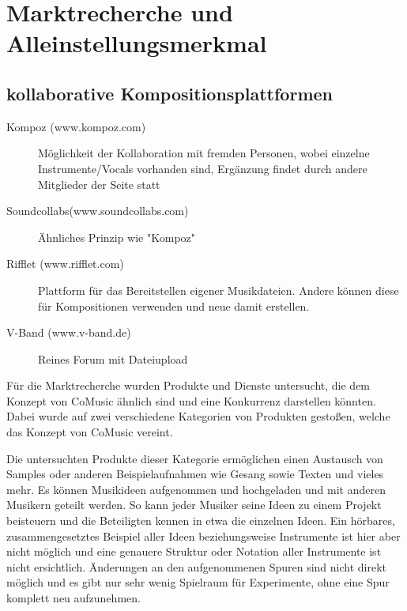 \documentclass[12pt]{scrartcl}
\begin{document}

\section{Marktrecherche und Alleinstellungsmerkmal}

\subsection{kollaborative Kompositionsplattformen}
\parskip 12pt
\begin{description}
\item[Kompoz (www.kompoz.com)]
Möglichkeit der Kollaboration mit fremden Personen, wobei
einzelne Instrumente/Vocals vorhanden sind,
Ergänzung findet durch andere Mitglieder der Seite statt

\item[Soundcollabs(www.soundcollabs.com)]
Ähnliches Prinzip wie "Kompoz"

\item[Rifflet (www.rifflet.com)]
Plattform für das Bereitstellen eigener Musikdateien. Andere können diese für Kompositionen verwenden und neue damit erstellen.

\item[V-Band (www.v-band.de)]
Reines Forum mit Dateiupload

\end{description}

\parskip 24pt


Für die Marktrecherche wurden Produkte und Dienste untersucht, die dem Konzept von CoMusic ähnlich sind und eine Konkurrenz darstellen könnten. Dabei wurde auf zwei verschiedene Kategorien von Produkten gestoßen, welche das Konzept von CoMusic vereint.



Die untersuchten Produkte dieser Kategorie ermöglichen einen Austausch von Samples oder anderen Beispielaufnahmen wie Gesang sowie Texten und vieles mehr. Es können Musikideen aufgenommen und hochgeladen und mit anderen Musikern geteilt werden. So kann jeder Musiker seine Ideen zu einem Projekt beisteuern und die Beteiligten kennen in etwa die einzelnen Ideen. Ein hörbares, zusammengesetztes Beispiel aller Ideen beziehungsweise Instrumente ist hier aber nicht möglich und eine genauere Struktur oder Notation aller Instrumente ist nicht ersichtlich. Änderungen an den aufgenommenen Spuren sind nicht direkt möglich und es gibt nur sehr wenig Spielraum für Experimente, ohne eine Spur komplett neu aufzunehmen.
\end{document}
